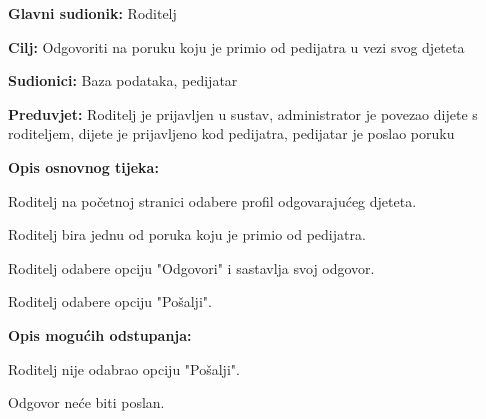 						\noindent {}
					\begin{packed_item}
						
						\item \textbf{Glavni sudionik: }Roditelj
						\item  \textbf{Cilj:} Odgovoriti na poruku koju je primio od pedijatra u vezi svog djeteta
						\item  \textbf{Sudionici:} Baza podataka, pedijatar
						\item  \textbf{Preduvjet:} Roditelj je prijavljen u sustav, administrator je povezao dijete s roditeljem, dijete je prijavljeno kod pedijatra, pedijatar je poslao poruku
						\item  \textbf{Opis osnovnog tijeka:}
						
						\item[] \begin{packed_enum}
							
							\item Roditelj na početnoj stranici odabere profil odgovarajućeg djeteta.
							\item Roditelj bira jednu od poruka koju je primio od pedijatra.
							\item Roditelj odabere opciju "Odgovori" i sastavlja svoj odgovor.
							\item Roditelj odabere opciju "Pošalji".
						\end{packed_enum}
						
						\item  \textbf{Opis mogućih odstupanja:}
						
						\item[] \begin{packed_item}
							
							\item[4.a] Roditelj nije odabrao opciju "Pošalji".
							\item[] \begin{packed_enum}
								
								\item Odgovor neće biti poslan.
							\end{packed_enum}
							
							
						\end{packed_item}
						
						
					\end{packed_item}
					
